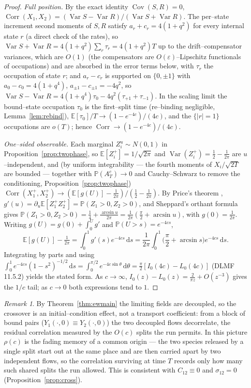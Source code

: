 \documentclass[11pt]{article}
\theoremstyle{plain}
\theoremstyle{definition}
\theoremstyle{remark}
\newtheorem{remark}[theorem]{Remark}
\DeclareMathOperator{\Var}{Var}\DeclareMathOperator{\Cov}{Cov}
\DeclareMathOperator{\Corr}{Corr}\DeclareMathOperator{\cum}{cum}
\newcommand{\E}{\mathbb{E}}\newcommand{\PP}{\mathbb{P}}\newcommand{\dd}{\,\mathrm{d}}
\newcommand{\eps}{\varepsilon}\newcommand{\Exp}{\mathrm{Exp}}
\begin{document}
\begin{proof}
\emph{Full position.} By the exact identity $\Cov(S,R)=0$,
$\Corr(X_1,X_2)=(\Var S-\Var R)/(\Var S+\Var R)$. The per--state increment second
moments of $S,R$ satisfy $a_r+c_r=4(1+q^2)$ for every internal state $r$ (a direct
check of the rates), so $\Var S+\Var R=4(1+q^2)\sum_r\tau_r=4(1+q^2)T$ up to the
drift--compensator variances, which are $O(1)$ (the compensators are
$O(\eps)$--Lipschitz functionals of occupations) and are absorbed in the error terms
below, with $\tau_r$ the occupation of state $r$; and $a_r-c_r$ is supported on $\{0,\pm1\}$ with
$a_0-c_0=4(1+q^4)$, $a_{\pm1}-c_{\pm1}=-4q^2$, so
$\Var S-\Var R=4(1+q^4)\tau_0-4q^2(\tau_{+1}+\tau_{-1})$. In the scaling limit the
bound--state occupation $\tau_0$ is the first--split time (re--binding negligible,
Lemma~\ref{lem:rebind}), $\E[\tau_0]/T\to(1-e^{-4c})/(4c)$, and the $\{|r|=1\}$
occupations are $o(T)$; hence $\Corr\to(1-e^{-4c})/(4c)$.

\emph{One--sided observable.} Each marginal $Z_i^u\sim N(0,1)$ in
Proposition~\ref{prop:twophase}, so $\E[Z_i^+]=1/\sqrt{2\pi}$ and
$\Var(Z_i^+)=\tfrac12-\tfrac1{2\pi}$ are $u$--independent, and (by uniform
integrability --- the fourth moments of $X_i/\sqrt{2T}$ are bounded --- together with
$\PP(A_T^c)\to0$ and Cauchy--Schwarz to remove the conditioning,
Proposition~\ref{prop:twophase})
$\Corr(X_1^+,X_2^+)\to(\E[g(U)]-\tfrac1{2\pi})/(\tfrac12-\tfrac1{2\pi})$. By Price's
theorem \cite{Price}, $g'(u)=\partial_u\E[Z_1^+Z_2^+]=\PP(Z_1>0,Z_2>0)$, and Sheppard's
orthant formula \cite{Sheppard} gives $\PP(Z_1>0,Z_2>0)=\tfrac14+\tfrac{\arcsin u}{2\pi}
=\tfrac1{2\pi}(\tfrac\pi2+\arcsin u)$, with $g(0)=\tfrac1{2\pi}$. Writing
$g(U)=g(0)+\int_0^U g'$ and $\PP(U>s)=e^{-4cs}$,
\[
  \E[g(U)]-\tfrac1{2\pi}=\int_0^1 g'(s)e^{-4cs}\dd s
  =\frac1{2\pi}\int_0^1\Big(\frac\pi2+\arcsin s\Big)e^{-4cs}\dd s.
\]
Integrating by parts and using
$\int_0^1 e^{-4cs}(1-s^2)^{-1/2}\dd s=\int_0^{\pi/2}e^{-4c\sin\theta}\dd\theta
=\tfrac\pi2[I_0(4c)-L_0(4c)]$ (DLMF 11.5.2) yields the stated form. As $c\to\infty$,
$I_0(z)-L_0(z)=\tfrac2{\pi z}+O(z^{-3})$ gives the $1/c$ tail; as $c\to0$ both expressions
tend to $1$.
\end{proof}

\begin{remark}\label{rem:icmeaning}
By Theorem~\ref{thm:ewmain} the limiting fields are decoupled, so the crossover is an
initial--condition effect, not a transport coefficient: from a block of bound pairs
($Y_1(\cdot,0)\equiv Y_2(\cdot,0)$) the two decoupled flows decorrelate, the residual
correlation measured by the $O(c)$ splits the run permits. In this picture $\rho(c)$ is
the fading memory of a common origin --- the two species released by a single split
start out at the same place and are then carried apart by two independent flows, so the
correlation surviving at time $T$ records only how many such shared splits the run
allowed. This is consistent with $C_{12}\equiv0$ and $\sigma_{12}=0$
(Proposition~\ref{prop:cross}).
\end{remark}
\end{document}
